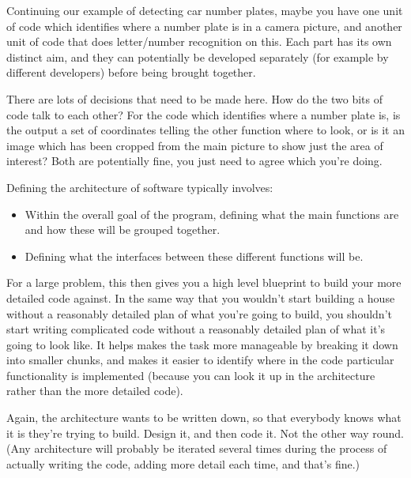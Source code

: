 \documentclass[letterpaper,10pt,british]{sphinxmanual}
\begin{document}
\sphinxAtStartPar
Continuing our example of detecting car number plates, maybe you have one unit of code which identifies where a number plate is in a camera picture, and another unit of code that does letter/number recognition on this. Each part has its own distinct aim, and they can potentially be developed separately (for example by different developers) before being brought together.

\sphinxAtStartPar
There are lots of decisions that need to be made here. How do the two bits of code talk to each other? For the code which identifies where a number plate is, is the output a set of coordinates telling the other function where to look, or is it an image which has been cropped from the main picture to show just the area of interest? Both are potentially fine, you just need to agree which you’re doing.

\sphinxAtStartPar
Defining the architecture of software typically involves:
\begin{itemize}
\item {} 
\sphinxAtStartPar
Within the overall goal of the program, defining what the main functions are and how these will be grouped together.

\item {} 
\sphinxAtStartPar
Defining what the interfaces between these different functions will be.

\end{itemize}

\sphinxAtStartPar
For a large problem, this then gives you a high level blueprint to build your more detailed code against. In the same way that you wouldn’t start building a house without a reasonably detailed plan of what you’re going to build, you shouldn’t start writing complicated code without a reasonably detailed plan of what it’s going to look like. It helps makes the task more manageable by breaking it down into smaller chunks, and makes it easier to identify where in the code particular functionality is implemented (because you can look it up in the architecture rather than the more detailed code).

\sphinxAtStartPar
Again, the architecture wants to be written down, so that everybody knows what it is they’re trying to build. Design it, and then code it. Not the other way round. (Any architecture will probably be iterated several times during the process of actually writing the code, adding more detail each time, and that’s fine.)

\sphinxstepscope
\end{document}
